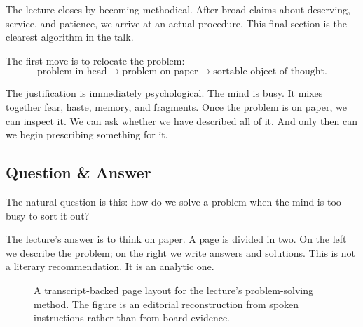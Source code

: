 The lecture closes by becoming methodical. After broad claims about deserving, service, and patience, we arrive at an actual procedure. This final section is the clearest algorithm in the talk.

The first move is to relocate the problem:
\begin{equation}
\text{problem in head} \rightarrow \text{problem on paper} \rightarrow \text{sortable object of thought}.
\end{equation}

The justification is immediately psychological. The mind is busy. It mixes together fear, haste, memory, and fragments. Once the problem is on paper, we can inspect it. We can ask whether we have described all of it. And only then can we begin prescribing something for it.

\subsection{Question \& Answer}

The natural question is this: how do we solve a problem when the mind is too busy to sort it out?

The lecture's answer is to think on paper. A page is divided in two. On the left we describe the problem; on the right we write answers and solutions. This is not a literary recommendation. It is an analytic one.

\begin{figure}[t]
\centering
{}
\caption{A transcript-backed page layout for the lecture's problem-solving method. The figure is an editorial reconstruction from spoken instructions rather than from board evidence.}
\end{figure}

